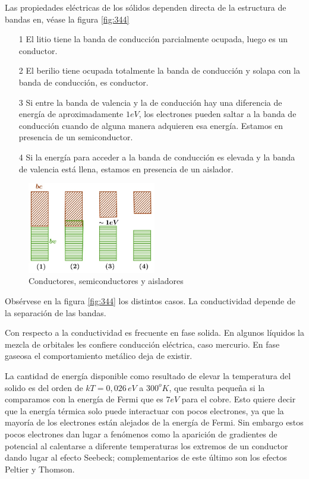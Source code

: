 Las propiedades eléctricas de los sólidos dependen directa de la estructura de bandas en, véase la figura \ref{fig:344}

\begin{itemize}
	\item[1] El litio tiene la banda de conducción parcialmente ocupada, luego es un conductor.
	
	\item[2] El berilio tiene ocupada totalmente la banda de conducción y solapa con la banda de conducción, es conductor.
	
	\item[3] Si entre la banda de valencia y la de conducción hay una diferencia de
energía de aproximadamente $1eV$, los electrones pueden saltar a la banda de conducción cuando de alguna manera adquieren esa energía. Estamos en presencia de un semiconductor.

	\item[4] Si la energía para acceder a la banda de conducción es elevada y la banda de valencia está llena, estamos en presencia de un aislador.

\end{itemize}


\begin{figure}[H]
    \centering
    \includegraphics[width=0.5\textwidth]{./Figures/fig344}
	\caption{Conductores, semiconductores y aisladores}
	\label{fig:34}
\end{figure}

Obsérvese en la figura \ref{fig:344} los distintos casos. La conductividad depende de la separación de las bandas. 

Con respecto a la conductividad es frecuente en fase solida. En algunos líquidos la mezcla de orbitales les confiere conducción eléctrica, caso mercurio. En fase gaseosa el comportamiento metálico deja de existir.

La cantidad de energía disponible como resultado de elevar la temperatura del solido es del orden de $kT=0,026\, eV$ a $300^{o}K$, que resulta pequeña si la comparamos con la energía de Fermi que es $7eV$ para el cobre. Esto quiere decir que la energía térmica solo puede interactuar con pocos electrones, ya que la mayoría de los electrones están alejados de la energía de Fermi. Sin embargo estos pocos electrones
dan lugar a fenómenos como la aparición de gradientes de potencial al calentarse a diferente temperaturas los extremos de un conductor dando lugar al efecto Seebeck; complementarios de este último son los efectos Peltier y Thomson.

